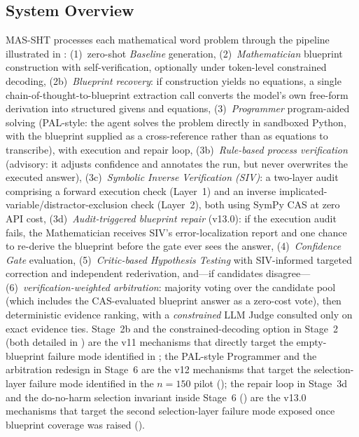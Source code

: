 \documentclass[11pt,a4paper]{article}
\begin{document}
\subsection{System Overview}
MAS-SHT processes each mathematical word problem through the pipeline illustrated in :
(1)~zero-shot \emph{Baseline} generation,
(2)~\emph{Mathematician} blueprint construction with self-verification, optionally under token-level constrained decoding,
(2b)~\emph{Blueprint recovery}: if construction yields no equations, a single chain-of-thought-to-blueprint extraction call converts the model's own free-form derivation into structured givens and equations,
(3)~\emph{Programmer} program-aided solving (PAL-style: the agent solves the problem directly in sandboxed Python, with the blueprint supplied as a cross-reference rather than as equations to transcribe), with execution and repair loop,
(3b)~\emph{Rule-based process verification} (advisory: it adjusts confidence and annotates the run, but never overwrites the executed answer),
(3c)~\emph{Symbolic Inverse Verification (SIV)}: a two-layer audit comprising a forward execution check (Layer~1) and an inverse implicated-variable/distractor-exclusion check (Layer~2), both using SymPy CAS at zero API cost,
(3d)~\emph{Audit-triggered blueprint repair} (v13.0): if the execution audit fails, the Mathematician receives SIV's error-localization report and one chance to re-derive the blueprint before the gate ever sees the answer,
(4)~\emph{Confidence Gate} evaluation,
(5)~\emph{Critic-based Hypothesis Testing} with SIV-informed targeted correction and independent rederivation, and---if candidates disagree---
(6)~\emph{verification-weighted arbitration}: majority voting over the candidate pool (which includes the CAS-evaluated blueprint answer as a zero-cost vote), then deterministic evidence ranking, with a \emph{constrained} LLM Judge consulted only on exact evidence ties.
Stage~2b and the constrained-decoding option in Stage~2 (both detailed in ) are the v11 mechanisms that directly target the empty-blueprint failure mode identified in ; the PAL-style Programmer and the arbitration redesign in Stage~6 are the v12 mechanisms that target the selection-layer failure mode identified in the $n{=}150$ pilot (); the repair loop in Stage~3d and the do-no-harm selection invariant inside Stage~6 () are the v13.0 mechanisms that target the second selection-layer failure mode exposed once blueprint coverage was raised ().
\end{document}
